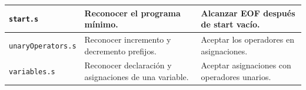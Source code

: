 \begin{longtable}{|
>{\raggedright\arraybackslash}p{}|
>{\raggedright\arraybackslash}p{}|
>{\raggedright\arraybackslash}p{}|}
\texttt{start\allowbreak .s} & Reconocer el programa mínimo. & Alcanzar EOF después de start vacío. \\ \hline
\texttt{unaryOperators\allowbreak .s} & Reconocer incremento y decremento prefijos. & Aceptar los operadores en asignaciones. \\ \hline
\texttt{variables\allowbreak .s} & Reconocer declaración y asignaciones de una variable. & Aceptar asignaciones con operadores unarios. \\ \hline
\end{longtable}
\endgroup
